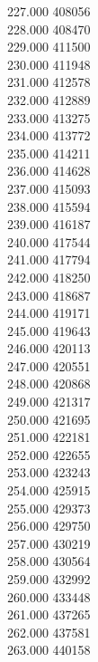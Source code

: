 { 227.000	408056 \\
 228.000	408470 \\
 229.000	411500 \\
 230.000	411948 \\
 231.000	412578 \\
 232.000	412889 \\
 233.000	413275 \\
 234.000	413772 \\
 235.000	414211 \\
 236.000	414628 \\
 237.000	415093 \\
 238.000	415594 \\
 239.000	416187 \\
 240.000	417544 \\
 241.000	417794 \\
 242.000	418250 \\
 243.000	418687 \\
 244.000	419171 \\
 245.000	419643 \\
 246.000	420113 \\
 247.000	420551 \\
 248.000	420868 \\
 249.000	421317 \\
 250.000	421695 \\
 251.000	422181 \\
 252.000	422655 \\
 253.000	423243 \\
 254.000	425915 \\
 255.000	429373 \\
 256.000	429750 \\
 257.000	430219 \\
 258.000	430564 \\
 259.000	432992 \\
 260.000	433448 \\
 261.000	437265 \\
 262.000	437581 \\
 263.000	440158 \\
}
